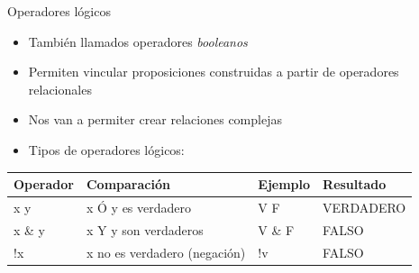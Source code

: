\documentclass[
  spanish,
  ignorenonframetext,
]{beamer}
\providecommand{\tightlist}{%
  \setlength{\itemsep}{0pt}\setlength{\parskip}{0pt}}
\begin{document}
\begin{frame}{Operadores lógicos}
\protect\hypertarget{operadores-luxf3gicos}{}
\begin{itemize}
\tightlist
\item
  También llamados operadores \emph{booleanos}\\
\item
  Permiten vincular proposiciones construidas a partir de operadores
  relacionales\\
\item
  Nos van a permiter crear relaciones complejas\\
\item
  Tipos de operadores lógicos:
\end{itemize}

\begin{longtable}[]{@{}llll@{}}
\toprule
Operador & Comparación & Ejemplo & Resultado \\
\midrule
\endhead
x \textbar{} y & x Ó y es verdadero & V \textbar{} F & VERDADERO \\
x \& y & x Y y son verdaderos & V \& F & FALSO \\
!x & x no es verdadero (negación) & !v & FALSO \\
\bottomrule
\end{longtable}
\end{frame}
\end{document}
